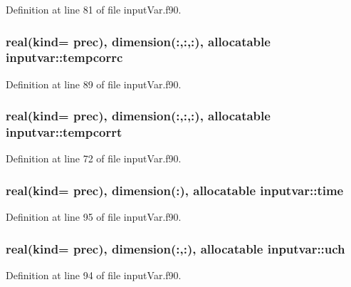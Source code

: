 Definition at line 81 of file input\-Var.\-f90.

\hypertarget{classinputvar_a378a362979a22545cd843bbf687ca511}{
\subsubsection[{tempcorrc}]{\setlength{\rightskip}{0pt plus 5cm}real(kind= prec), dimension(\-:,\-:,\-:), allocatable inputvar\-::tempcorrc}}\label{classinputvar_a378a362979a22545cd843bbf687ca511}


Definition at line 89 of file input\-Var.\-f90.

\hypertarget{classinputvar_a918356589b5f04f76333e6a65de35fb8}{
\subsubsection[{tempcorrt}]{\setlength{\rightskip}{0pt plus 5cm}real(kind= prec), dimension(\-:,\-:,\-:), allocatable inputvar\-::tempcorrt}}\label{classinputvar_a918356589b5f04f76333e6a65de35fb8}


Definition at line 72 of file input\-Var.\-f90.

\hypertarget{classinputvar_a7d20a57b0a7dfe6c386e831f25636546}{
\subsubsection[{time}]{\setlength{\rightskip}{0pt plus 5cm}real(kind= prec), dimension(\-:), allocatable inputvar\-::time}}\label{classinputvar_a7d20a57b0a7dfe6c386e831f25636546}


Definition at line 95 of file input\-Var.\-f90.

\hypertarget{classinputvar_a53339aa6533c8e2333ec3eaa4a54796b}{
\subsubsection[{uch}]{\setlength{\rightskip}{0pt plus 5cm}real(kind= prec), dimension(\-:,\-:), allocatable inputvar\-::uch}}\label{classinputvar_a53339aa6533c8e2333ec3eaa4a54796b}


Definition at line 94 of file input\-Var.\-f90.

